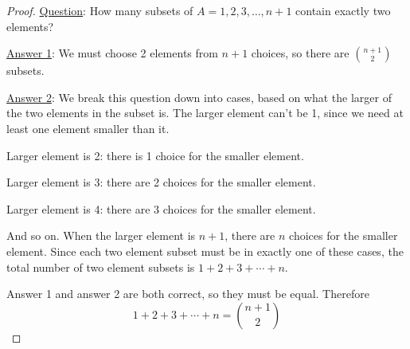 \documentclass[10pt]{exam}
\begin{document}
\begin{questions}

\question \begin{proof}
           \underline{Question}: How many subsets of $A = {1,2,3, \ldots, n+1}$ contain exactly two elements?
           
           \underline{Answer 1}: We must choose 2 elements from $n+1$ choices, so there are ${n+1 \choose 2}$ subsets.
           
           \underline{Answer 2}: We break this question down into cases, based on what the larger of the two elements in the subset is. The larger element can't be 1, since we need at least one element smaller than it.
           
           Larger element is 2: there is 1 choice for the smaller element.
           
           Larger element is 3: there are 2 choices for the smaller element.
           
           Larger element is 4: there are 3 choices for the smaller element.
           
           And so on.  When the larger element is $n+1$, there are $n$ choices for the smaller element.  Since each two element subset must be in exactly one of these cases, the total number of two element subsets is $1 + 2 + 3 + \cdots + n$.
           
           Answer 1 and answer 2 are both correct, so they must be equal.  Therefore
           \[1 + 2 + 3 + \cdots + n = {n+1 \choose 2}\]
          \end{proof}


\question %
\end{questions}
\end{document}

